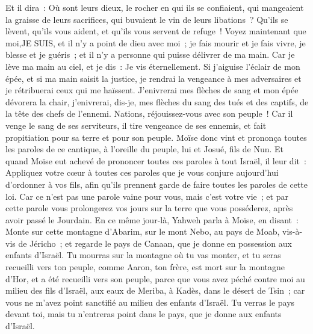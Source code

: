 \begin{multicols}{2}
Et il dira~: Où sont leurs dieux, le rocher en qui ils se confiaient,
qui mangeaient la graisse de leurs sacrifices, qui buvaient le vin de leurs libations~? Qu'ils se lèvent, qu'ils vous aident, et qu'ils vous servent de refuge~!
Voyez maintenant que moi,JE SUIS, et il n'y a point de dieu avec moi~; je fais mourir et je fais vivre, je blesse et je guéris~; et il n'y a personne qui puisse délivrer de ma main.
Car je lève ma main au ciel, et je dis~: Je vis éternellement.
Si j'aiguise l'éclair de mon épée, et si ma main saisit la justice, je rendrai la vengeance à mes adversaires et je rétribuerai ceux qui me haïssent.
 J'enivrerai mes flèches de sang et mon épée dévorera la chair, j'enivrerai, dis-je, mes flèches du sang des tués et des captifs, de la tête des chefs de l'ennemi.
Nations, réjouissez-vous avec son peuple~! Car il venge le sang de ses serviteurs, il tire vengeance de ses ennemis, et fait propitiation pour sa terre et pour son peuple.
Moïse donc vint et prononça toutes les paroles de ce cantique, à l'oreille du peuple, lui et Josué, fils de Nun.
Et quand Moïse eut achevé de prononcer toutes ces paroles à tout Israël,
il leur dit~: Appliquez votre cœur à toutes ces paroles que je vous conjure aujourd'hui d'ordonner à vos fils, afin qu'ils prennent garde de faire toutes les paroles de cette loi.
Car ce n'est pas une parole vaine pour vous, mais c'est votre vie~; et par cette parole vous prolongerez vos jours sur la terre que vous posséderez, après avoir passé le Jourdain.
En ce même jour-là, Yahweh parla à Moïse, en disant~:
Monte sur cette montagne d'Abarim, sur le mont Nebo, au pays de Moab, vis-à-vis de Jéricho~; et regarde le pays de Canaan, que je donne en possession aux enfants d'Israël.
Tu mourras sur la montagne où tu vas monter, et tu seras recueilli vers ton peuple, comme Aaron, ton frère, est mort sur la montagne d'Hor, et a été recueilli vers son peuple,
parce que vous avez péché contre moi au milieu des fils d'Israël, aux eaux de Meriba, à Kadès, dans le désert de Tsin~; car vous ne m'avez point sanctifié au milieu des enfants d'Israël.
Tu verras le pays devant toi, mais tu n'entreras point dans le pays, que je donne aux enfants d'Israël.

\end{multicols}
